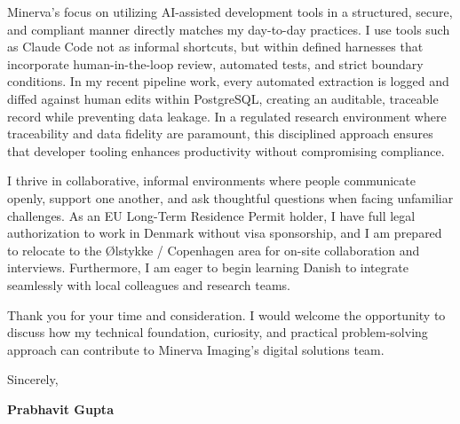 \documentclass[10pt,a4paper]{article}
\begin{document}
Minerva's focus on utilizing AI-assisted development tools in a structured, secure, and compliant manner directly matches my day-to-day practices. I use tools such as Claude Code not as informal shortcuts, but within defined harnesses that incorporate human-in-the-loop review, automated tests, and strict boundary conditions. In my recent pipeline work, every automated extraction is logged and diffed against human edits within PostgreSQL, creating an auditable, traceable record while preventing data leakage. In a regulated research environment where traceability and data fidelity are paramount, this disciplined approach ensures that developer tooling enhances productivity without compromising compliance.

I thrive in collaborative, informal environments where people communicate openly, support one another, and ask thoughtful questions when facing unfamiliar challenges. As an EU Long-Term Residence Permit holder, I have full legal authorization to work in Denmark without visa sponsorship, and I am prepared to relocate to the Ølstykke / Copenhagen area for on-site collaboration and interviews. Furthermore, I am eager to begin learning Danish to integrate seamlessly with local colleagues and research teams.

Thank you for your time and consideration. I would welcome the opportunity to discuss how my technical foundation, curiosity, and practical problem-solving approach can contribute to Minerva Imaging's digital solutions team.

\vspace{10pt}

Sincerely,

\vspace{8pt}
\textbf{Prabhavit Gupta}
\end{document}
